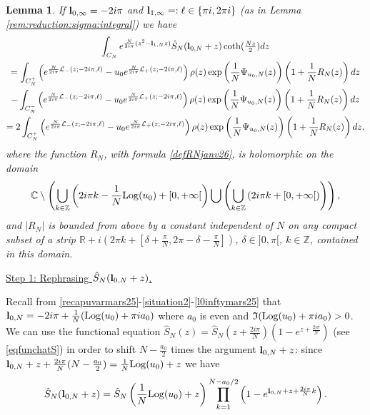 \documentclass[11pt]{amsart}
\newtheorem{lem}[teo]{Lemma}
\newcommand{\mr}{\mathbb{R}}
\newcommand{\mc}{\mathbb{C}}
\newcommand{\mz}{\mathbb{Z}}
\newcommand{\bl}{{\bf l}}
\newcommand{\Log}{{\rm Log}}
\begin{document}
{\begin{lem}\label{qcintjui25} If $\textstyle \bl_{0,\infty} = -2i\pi$ and $\textstyle \bl_{1,\infty} =: \ell\in \{\pi i, 2\pi i\}$ (as in Lemma \ref{rem:reduction:sigma:integral}) we have
	\begin{multline*} \int_{C_N} e^{\frac{N}{2i\pi}(z^2 - \bl_{1,N}z)}\hat S_N(\bl_{0,N} + z)\textstyle \coth(\frac{Nz}{2}) dz   \\
= \int_{C^+_N} \left( e^{\frac{N}{2i\pi} \mathcal{L}_{-}(z;-2i\pi,\ell)} - u_0 e^{\frac{N}{2i\pi} \mathcal{L}_{+}(z;-2i\pi,\ell)}\right) \rho(z) \exp\left(\frac{1}{N}{\Psi_{u_0,N}(z)}\right) \left(1 + \frac{1}{N}R_N(z)\right) dz \\ -\int_{C^-_N} \left( e^{\frac{N}{2i\pi} \mathcal{L}_{-}(z;-2i\pi,\ell)}  - u_0 e^{\frac{N}{2i\pi} \mathcal{L}_{+}(z;-2i\pi,\ell)}\right)\rho(z)  \exp\left(\frac{1}{N}{\Psi_{u_0,N}(z)}\right) \left(1 + \frac{1}{N}R_N(z)\right) dz\\
= 2\int_{C^+_N} \left( e^{\frac{N}{2i\pi} \mathcal{L}_{-}(z;-2i\pi,\ell)} - u_0 e^{\frac{N}{2i\pi} \mathcal{L}_{+}(z;-2i\pi,\ell)}\right) \rho(z) \exp\left(\frac{1}{N}{\Psi_{u_0,N}(z)}\right) \left(1 + \frac{1}{N}R_N(z)\right) dz,
	\end{multline*}
where the function $R_N$, with formula \eqref{defRNjanv26}, is holomorphic on the domain
\begin{equation}\label{domRN}
\mc \setminus \left(\bigcup_{k\in \mz} \left(2i\pi k  -\frac{1}{N}\Log(u_{0})+[0,+\infty[\right)\bigcup \left(\bigcup_{k\in \mz} \left(2i\pi k +[0,+\infty[\right)\right)\right),
\end{equation}
and $\vert R_N\vert$ is bounded from above by a constant independent of $N$ on any compact subset of a strip $\textstyle \mr + i(2\pi k + [\delta + \frac{\pi}{N}, 2\pi-\delta - \frac{\pi}{N}])$, $\textstyle \delta\in ]0,\pi[$, $k\in \mz$, contained in this domain. 
\end{lem}

\proof \underline{Step 1: Rephrasing $\textstyle  \hat S_N(\bl_{0,N} + z)$.}

Recall from \eqref{recapuvarmars25}-\eqref{situation2}-\eqref{l0inftymars25} that $\textstyle \bl_{0,N}= -2i\pi + \frac{1}{N}(\Log(u_{0}) +\pi ia_{0})$ where $a_0$ is even and $\mathfrak{I}(\Log(u_{0}) +\pi ia_{0})>0$. We can use the functional equation $\textstyle\hat S_{N}(z) = \hat S_{N}(z+\frac{2i\pi}{N})(1-e^{z+\frac{2i\pi}{N}})$ (see \eqref{eqfunchatS}) in order to shift $N-\textstyle \frac{a_0}{2}$ times the argument $\bl_{0,N} + z$: since $\textstyle \bl_{0,N} + z+\frac{2i\pi}{N}(N-\frac{a_0}{2}) = \frac{1}{N}\Log(u_{0}) +z$ we have
\begin{equation}\label{prodShatdec25prooflem51}
\hat S_N(\bl_{0,N} + z) = \hat S_N\left(\frac{1}{N}\Log(u_{0}) +z\right) \prod_{k=1}^{N-a_0/2}\left(1-e^{\bl_{0,N} + z+\frac{2i\pi}{N}k}\right).
\end{equation}


}
\end{document}
